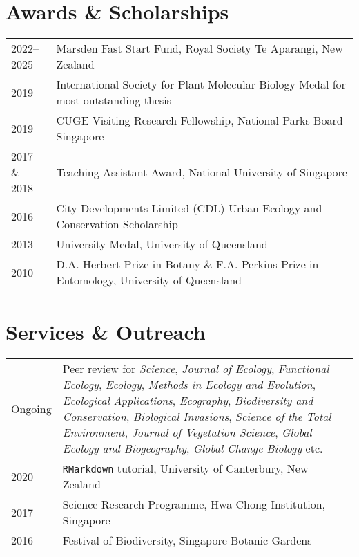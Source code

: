 \documentclass[a4paper]{article}
\begin{document}
\section*{Awards \& Scholarships}
\begin{tabular}{p{0.13\linewidth} p{0.87\linewidth}}
2022--2025 & Marsden Fast Start Fund, Royal Society Te Ap\=arangi, New Zealand \\
2019 & International Society for Plant Molecular Biology Medal for most outstanding thesis \\
2019 & CUGE Visiting Research Fellowship, National Parks Board Singapore \\
2017 \& 2018 & Teaching Assistant Award, National University of Singapore \\
2016 & City Developments Limited (CDL) Urban Ecology and Conservation Scholarship \\
2013 & University Medal, University of Queensland \\
2010 & D.A. Herbert Prize in Botany \& F.A. Perkins Prize in Entomology, University of Queensland 
\end{tabular}


\section*{Services \& Outreach}
\begin{tabular}{p{0.13\linewidth} p{0.87\linewidth}}
Ongoing & Peer review for \textit{Science}, \textit{Journal of Ecology}, \textit{Functional Ecology}, \textit{Ecology}, \textit{Methods in Ecology and Evolution}, \textit{Ecological Applications}, \textit{Ecography}, \textit{Biodiversity and Conservation}, \textit{Biological Invasions}, \textit{Science of the Total Environment}, \textit{Journal of Vegetation Science}, \textit{Global Ecology and Biogeography}, \textit{Global Change Biology} etc.\\
2020 & \texttt{RMarkdown} tutorial, University of Canterbury, New Zealand \\
2017 & Science Research Programme, Hwa Chong Institution, Singapore \\
2016 & Festival of Biodiversity, Singapore Botanic Gardens \\
\end{tabular}
\end{document}
